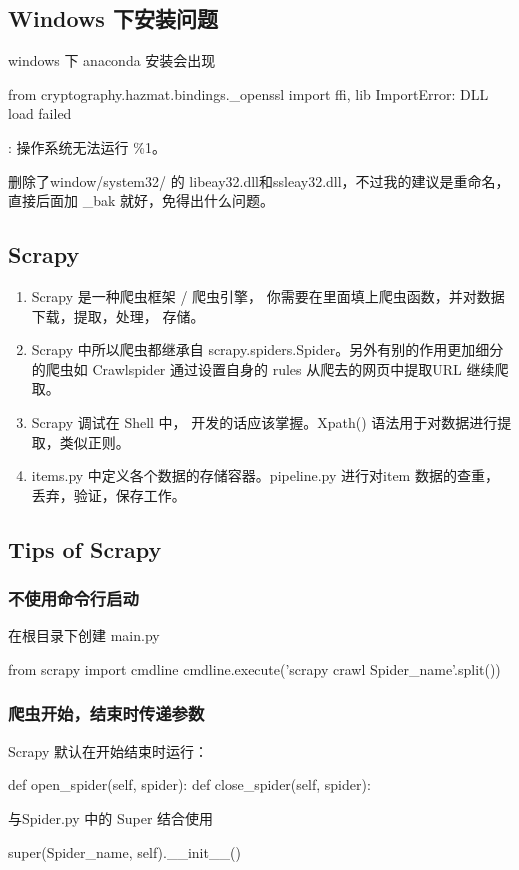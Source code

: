 \documentclass{article}
\begin{document}
    \subsection{Windows 下安装问题}
    windows 下 anaconda 安装会出现

    \begin{python}
from cryptography.hazmat.bindings._openssl import ffi, lib
ImportError: DLL load failed
    \end{python}: 操作系统无法运行 \%1。

     删除了window/system32/ 的 libeay32.dll和ssleay32.dll，不过我的建议是重命名，直接后面加 {\_bak} 就好，免得出什么问题。

    \subsection{Scrapy}
      \begin{enumerate}
            \item Scrapy 是一种爬虫框架 / 爬虫引擎， 你需要在里面填上爬虫函数，并对数据下载，提取，处理， 存储。
            \item Scrapy 中所以爬虫都继承自  scrapy.spiders.Spider。另外有别的作用更加细分的爬虫如 Crawlspider 通过设置自身的 rules 从爬去的网页中提取URL 继续爬取。
            \item Scrapy 调试在 Shell 中， 开发的话应该掌握。Xpath() 语法用于对数据进行提取，类似正则。
            \item items.py 中定义各个数据的存储容器。pipeline.py 进行对item 数据的查重，丢弃，验证，保存工作。
      \end{enumerate}

    \subsection{Tips of Scrapy}
      \subsubsection{不使用命令行启动}
          在根目录下创建 main.py 
          \begin{python}
from scrapy import cmdline
cmdline.execute('scrapy crawl Spider_name'.split())
          \end{python}

     \subsubsection{ 爬虫开始，结束时传递参数 }
          Scrapy 默认在开始结束时运行：
          \begin{python}
def open_spider(self, spider):
def close_spider(self, spider):
          \end{python}

          与Spider.py 中的 Super 结合使用
          \begin{python}
super(Spider_name,  self).__init__()
          \end{python}
\end{document}
